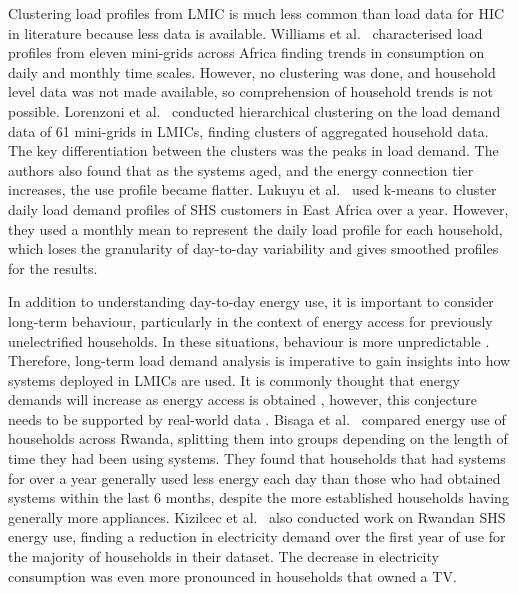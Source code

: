 Clustering load profiles from LMIC is much less common than load data for HIC in literature because less data is available. Williams et al.\ \cite{Williams2017LoadMicrogrids} characterised load profiles from eleven mini-grids across Africa finding trends in consumption on daily and monthly time scales. However, no clustering was done, and household level data was not made available, so comprehension of household trends is not possible. Lorenzoni et al.\ \cite{Lorenzoni2020ClassificationApproach} conducted hierarchical clustering on the load demand data of 61 mini-grids in LMICs, finding clusters of aggregated household data. The key differentiation between the clusters was the peaks in load demand. The authors also found that as the systems aged, and the energy connection tier increases, the use profile became flatter.
Lukuyu et al.\ \cite{Lukuyu2023PurchasingAfrica} used k-means to cluster daily load demand profiles of SHS customers in East Africa over a year. However, they used a monthly mean to represent the daily load profile for each household, which loses the granularity of day-to-day variability and gives smoothed profiles for the results.

In addition to understanding day-to-day energy use, it is important to consider long-term behaviour, particularly in the context of energy access for previously unelectrified households. In these situations, behaviour is more unpredictable \cite{Riva2018Long-termPerspective,Muhumuza2018EnergyCountries}. Therefore, long-term load demand analysis is imperative to gain insights into how systems deployed in LMICs are used. %
%
It is commonly thought that energy demands will increase as energy access is obtained \cite{Riva2018Long-termPerspective,Muhumuza2018EnergyCountries,Opiyo2020HowCommunities}, however, this conjecture needs to be supported by real-world data \cite{Riva2019ModellingPlanning}. Bisaga et al.\ \cite{Bisaga2018ToLens} compared energy use of households across Rwanda, splitting them into groups depending on the length of time they had been using systems. They found that households that had systems for over a year generally used less energy each day than those who had obtained systems within the last 6 months, despite the more established households having generally more appliances. Kizilcec et al.\ \cite{Kizilcec2022ForecastingAccess} also conducted work on Rwandan SHS energy use, finding a reduction in electricity demand over the first year of use for the majority of households in their dataset. The decrease in electricity consumption was even more pronounced in households that owned a TV.

